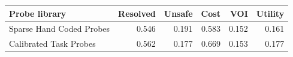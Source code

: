 \begin{tabular}{lrrrrr}
\toprule
Probe library & Resolved & Unsafe & Cost & VOI & Utility \\
\midrule
Sparse Hand Coded Probes & 0.546 & 0.191 & 0.583 & 0.152 & 0.161 \\
Calibrated Task Probes & 0.562 & 0.177 & 0.669 & 0.153 & 0.177 \\
\bottomrule
\end{tabular}
